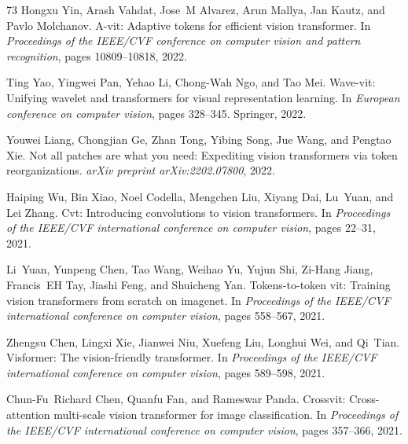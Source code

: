 \documentclass{article}
\begin{document}
\begin{thebibliography}{73}
Hongxu Yin, Arash Vahdat, Jose~M Alvarez, Arun Mallya, Jan Kautz, and Pavlo
  Molchanov.
\newblock A-vit: Adaptive tokens for efficient vision transformer.
\newblock In \emph{Proceedings of the IEEE/CVF conference on computer vision
  and pattern recognition}, pages 10809--10818, 2022.

Ting Yao, Yingwei Pan, Yehao Li, Chong-Wah Ngo, and Tao Mei.
\newblock Wave-vit: Unifying wavelet and transformers for visual representation
  learning.
\newblock In \emph{European conference on computer vision}, pages 328--345.
  Springer, 2022.

Youwei Liang, Chongjian Ge, Zhan Tong, Yibing Song, Jue Wang, and Pengtao Xie.
\newblock Not all patches are what you need: Expediting vision transformers via
  token reorganizations.
\newblock \emph{arXiv preprint arXiv:2202.07800}, 2022.

Haiping Wu, Bin Xiao, Noel Codella, Mengchen Liu, Xiyang Dai, Lu~Yuan, and Lei
  Zhang.
\newblock Cvt: Introducing convolutions to vision transformers.
\newblock In \emph{Proceedings of the IEEE/CVF international conference on
  computer vision}, pages 22--31, 2021.

Li~Yuan, Yunpeng Chen, Tao Wang, Weihao Yu, Yujun Shi, Zi-Hang Jiang,
  Francis~EH Tay, Jiashi Feng, and Shuicheng Yan.
\newblock Tokens-to-token vit: Training vision transformers from scratch on
  imagenet.
\newblock In \emph{Proceedings of the IEEE/CVF international conference on
  computer vision}, pages 558--567, 2021.

Zhengsu Chen, Lingxi Xie, Jianwei Niu, Xuefeng Liu, Longhui Wei, and Qi~Tian.
\newblock Visformer: The vision-friendly transformer.
\newblock In \emph{Proceedings of the IEEE/CVF international conference on
  computer vision}, pages 589--598, 2021{}.

Chun-Fu~Richard Chen, Quanfu Fan, and Rameswar Panda.
\newblock Crossvit: Cross-attention multi-scale vision transformer for image
  classification.
\newblock In \emph{Proceedings of the IEEE/CVF international conference on
  computer vision}, pages 357--366, 2021{}.


\end{thebibliography}
\end{document}
